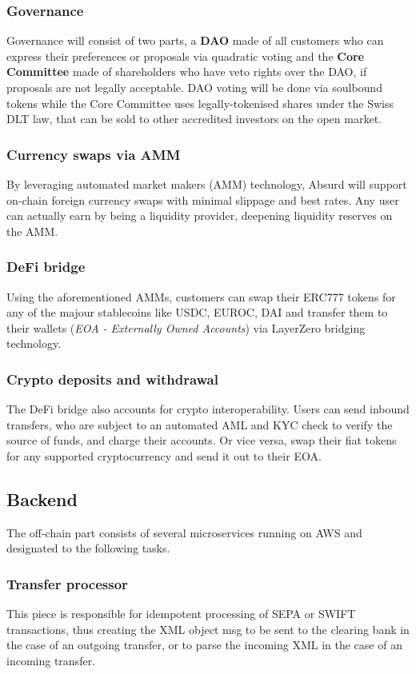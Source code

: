 \documentclass[a4paper,10 pt]{article}
\theoremstyle{definition}
\begin{document}
\subsubsection{Governance}\label{daoSub}
Governance will consist of two parts, a \textbf{DAO} made of all customers who can express their preferences or proposals via quadratic voting and the \textbf{Core Committee} made of shareholders who have veto rights over the DAO, if proposals are not legally acceptable.
DAO voting will be done via soulbound tokens while the Core Committee uses legally-tokenised shares under the Swiss DLT law, that can be sold to other accredited investors on the open market.

\subsubsection{Currency swaps via AMM}\label{ammSub}
By leveraging automated market makers (AMM) technology, Absurd will support on-chain foreign currency swaps with minimal slippage and best rates. Any user can actually earn by being a liquidity provider, deepening liquidity reserves on the AMM.

\subsubsection{DeFi bridge}\label{bridgeSub}
Using the aforementioned AMMs, customers can swap their ERC777 tokens for any of the majour stablecoins like USDC, EUROC, DAI and transfer them to their wallets (\textit{EOA - Externally Owned Accounts}) via LayerZero bridging technology.

\subsubsection{Crypto deposits and withdrawal}\label{cryptoDepositsSub}
The DeFi bridge also accounts for crypto interoperability. Users can send inbound transfers, who are subject to an automated AML and KYC check to verify the source of funds, and charge their accounts. Or vice versa, swap their fiat tokens for any supported cryptocurrency and send it out to their EOA.

\subsection{Backend}
The off-chain part consists of several microservices running on AWS and designated to the following tasks.

\subsubsection{Transfer processor}\label{transferProcessorSub}
This piece is responsible for idempotent processing of SEPA or SWIFT transactions, thus creating the XML object msg to be sent to the clearing bank in the case of an outgoing transfer, or to parse the incoming XML in the case of an incoming transfer.
\end{document}
